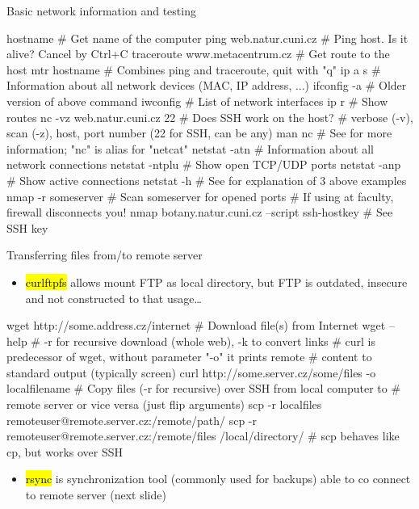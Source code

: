 \documentclass[compress, ucs, xelatex, 11pt, xcolor=svgnames,
  hyperref={
    bookmarks=true,
    unicode=true,
    colorlinks=true,
    pdftitle={Linux, command line and MetaCentrum},
    plainpages=false,
    pdfauthor={Vojtech Zeisek},
    pdfsubject={Course about use of Linux command line, writing shell scripts and using MetaCentrum of CESNET},
    pdfcreator={XeLaTeX},
    pdfkeywords={Linux, GNU, BASH, shell, command line, MetaCentrum},
    linkcolor=Red,
    anchorcolor=Blue,
    citecolor=Purple,
    filecolor=DodgerBlue,
    menucolor=DarkOrchid,
    urlcolor=DeepSkyBlue,
    pdftex},
  url={hyphens, lowtilde} %
  ]{beamer}
\renewcommand{\texttt}[1]{\hl{\ttfamily #1}}
\begin{document}
\begin{frame}[fragile]{Basic network information and testing}
  \begin{bashcode}
    hostname # Get name of the computer
    ping web.natur.cuni.cz # Ping host. Is it alive? Cancel by Ctrl+C
    traceroute www.metacentrum.cz # Get route to the host
    mtr hostname # Combines ping and traceroute, quit with "q"
    ip a s # Information about all network devices (MAC, IP address, ...)
    ifconfig -a # Older version of above command
    iwconfig # List of network interfaces
    ip r # Show routes
    nc -vz web.natur.cuni.cz 22 # Does SSH work on the host?
      # verbose (-v), scan (-z), host, port number (22 for SSH, can be any)
    man nc # See for more information; "nc" is alias for "netcat"
    netstat -atn # Information about all network connections
    netstat -ntplu # Show open TCP/UDP ports
    netstat -anp # Show active connections
    netstat -h # See for explanation of 3 above examples
    nmap -r someserver # Scan someserver for opened ports
                       # If using at faculty, firewall disconnects you!
    nmap botany.natur.cuni.cz --script ssh-hostkey # See SSH key
  \end{bashcode}
\end{frame}

\begin{frame}[fragile]{Transferring files from/to remote server}
  \label{transfers}
  \begin{itemize}
    \item \texttt{curlftpfs} allows mount FTP as local directory, but FTP is outdated, insecure and not constructed to that usage\ldots
  \end{itemize}
  \begin{bashcode}
    wget http://some.address.cz/internet # Download file(s) from Internet
    wget --help # -r for recursive download (whole web), -k to convert links
    # curl is predecessor of wget, without parameter "-o" it prints remote
    # content to standard output (typically screen)
    curl http://some.server.cz/some/files -o localfilename
    # Copy files (-r for recursive) over SSH from local computer to
    # remote server or vice versa (just flip arguments)
    scp -r localfiles remoteuser@remote.server.cz:/remote/path/
    scp -r remoteuser@remote.server.cz:/remote/files /local/directory/
    # scp behaves like cp, but works over SSH
  \end{bashcode}
  \begin{itemize}
    \item \texttt{rsync} is synchronization tool (commonly used for backups) able to co connect to remote server (next slide)
  \end{itemize}
\end{frame}
\end{document}
